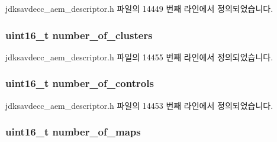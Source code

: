 jdksavdecc\+\_\+aem\+\_\+descriptor.\+h 파일의 14449 번째 라인에서 정의되었습니다.

\subsubsection[{\texorpdfstring{number\+\_\+of\+\_\+clusters}{number_of_clusters}}]{\setlength{\rightskip}{0pt plus 5cm}uint16\+\_\+t number\+\_\+of\+\_\+clusters}\hypertarget{structjdksavdecc__descriptor__stream__port_a4e1eccd0b455e87131e38deaa98b7a7d}{}\label{structjdksavdecc__descriptor__stream__port_a4e1eccd0b455e87131e38deaa98b7a7d}


jdksavdecc\+\_\+aem\+\_\+descriptor.\+h 파일의 14455 번째 라인에서 정의되었습니다.

\subsubsection[{\texorpdfstring{number\+\_\+of\+\_\+controls}{number_of_controls}}]{\setlength{\rightskip}{0pt plus 5cm}uint16\+\_\+t number\+\_\+of\+\_\+controls}\hypertarget{structjdksavdecc__descriptor__stream__port_a0104bea638bdadf1a547c2b93813e22f}{}\label{structjdksavdecc__descriptor__stream__port_a0104bea638bdadf1a547c2b93813e22f}


jdksavdecc\+\_\+aem\+\_\+descriptor.\+h 파일의 14453 번째 라인에서 정의되었습니다.

\subsubsection[{\texorpdfstring{number\+\_\+of\+\_\+maps}{number_of_maps}}]{\setlength{\rightskip}{0pt plus 5cm}uint16\+\_\+t number\+\_\+of\+\_\+maps}\hypertarget{structjdksavdecc__descriptor__stream__port_a6d00316ed943197ab46c0af22c1d430a}{}\label{structjdksavdecc__descriptor__stream__port_a6d00316ed943197ab46c0af22c1d430a}


